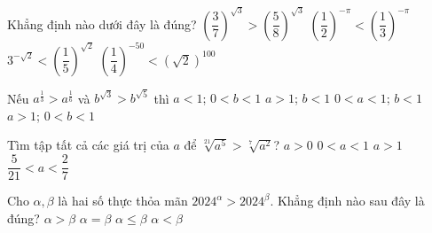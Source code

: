 

\begin{ex}%
	Khẳng định nào dưới đây  là đúng?
	 \choice
		 {$\left(\dfrac{3}{7}\right)^{\sqrt{3}}>\left(\dfrac{5}{8}\right)^{\sqrt{3}}$}
		 {\True $\left(\dfrac{1}{2}\right)^{-\pi}<\left(\dfrac{1}{3}\right)^{-\pi}$}
		 {$3^{-\sqrt{2}}<\left(\dfrac{1}{5}\right)^{\sqrt{2}}$}
		 {$\left(\dfrac{1}{4}\right)^{-50}<\left(\sqrt{2}\right)^{100}$}
\end{ex}

\begin{ex}%
	 Nếu $a^{\tfrac{1}{3}}>a^{\tfrac{1}{6}}$ và $b^{\sqrt{3}}>b^{\sqrt{5}}$ thì
	\choice 
		 {$a<1$; $0<b<1$}
		 {$a>1$; $b<1$}
		{$0<a<1$;  $b<1$}
		{\True $a>1$; $0<b<1$} 
\end{ex}

\begin{ex}%
	Tìm tập tất cả các giá trị của $a$  để $\sqrt[21]{a^5}>\sqrt[7]{a^2}$?
	 \choice
		 {$a>0$}
		 {\True $0<a<1$}
		{$a>1$} 
		 {$\dfrac{5}{21}<a<\dfrac{2}{7}$}
\end{ex}

\begin{ex}%
	Cho $\alpha, \beta$ là hai số thực thỏa mãn $2024^{\alpha} > 2024^{\beta}$. Khẳng định nào sau đây  là đúng?
	\choice 
		{\True  $\alpha > \beta$}
		 {$\alpha=\beta$}
		{$\alpha \leq \beta$} 
		{$\alpha <  \beta$}
\end{ex}

